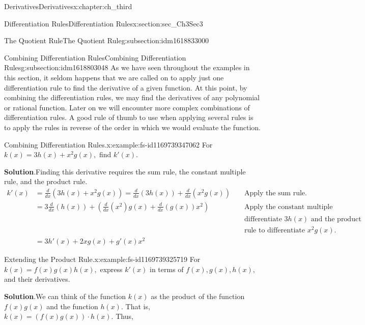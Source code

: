 \documentclass[oneside,10pt,]{book}
\newcommand{\blocktitlefont}{\relax}
\numberwithin{equation}{section}
\newcommand{\amp}{&}
\begin{document}
\begin{chapterptx}{Derivatives}{}{Derivatives}{}{}{x:chapter:ch_third}
\begin{sectionptx}{Differentiation Rules}{}{Differentiation Rules}{}{}{x:section:sec_Ch3Sec3}
\begin{subsectionptx}{The Quotient Rule}{}{The Quotient Rule}{}{}{g:subsection:idm1618833000}
\end{subsectionptx}
%
%
\typeout{************************************************}
\typeout{************************************************}
%
\begin{subsectionptx}{Combining Differentiation Rules}{}{Combining Differentiation Rules}{}{}{g:subsection:idm1618803048}
As we have seen throughout the examples in this section, it seldom happens that we are called on to apply just one differentiation rule to find the derivative of a given function. At this point, by combining the differentiation rules, we may find the derivatives of any polynomial or rational function. Later on we will encounter more complex combinations of differentiation rules. A good rule of thumb to use when applying several rules is to apply the rules in reverse of the order in which we would evaluate the function.%
\begin{example}{Combining Differentiation Rules.}{x:example:fs-id1169739347062}%
For \(k(x)=3h(x)+x^2g(x),\) find \(k'(x).\)%
\par\smallskip%
\noindent\textbf{\blocktitlefont Solution}.\hypertarget{g:solution:idm1618798824}{}\quad{}Finding this derivative requires the sum rule, the constant multiple rule, and the product rule.%
%
\begin{align*}
k'(x)\amp=\frac{d}{dx}(3h(x)+x^2g(x))=\frac{d}{dx}(3h(x))+\frac{d}{dx}(x^2g(x))\amp\amp \text{ Apply the sum rule. }\\
\amp=3\frac{d}{dx}(h(x))+(\frac{d}{dx}(x^2)g(x)+\frac{d}{dx}(g(x))x^2)\amp\amp\text{ Apply the constant multiple rule to }\\
\amp \amp \amp \text{ differentiate } 3h(x) \text{ and the product }\\
\amp \amp \amp \text{ rule to differentiate } x^2g(x).\\
\amp=3h'(x)+2xg(x)+g'(x)x^2
\end{align*}
\end{example}
\begin{example}{Extending the Product Rule.}{x:example:fs-id1169739325719}%
For \(k(x)=f(x)g(x)h(x),\) express \(k'(x)\) in terms of \(f(x),g(x),h(x),\) and their derivatives.%
\par\smallskip%
\noindent\textbf{\blocktitlefont Solution}.\hypertarget{g:solution:idm1618794856}{}\quad{}We can think of the function \(k(x)\) as the product of the function \(f(x)g(x)\) and the function \(h(x).\) That is, \(k(x)=(f(x)g(x))\cdot h(x).\) Thus,%
%
\begin{align*}

\end{align*}
\end{example}
\end{subsectionptx}
\end{sectionptx}
\end{chapterptx}
\end{document}
